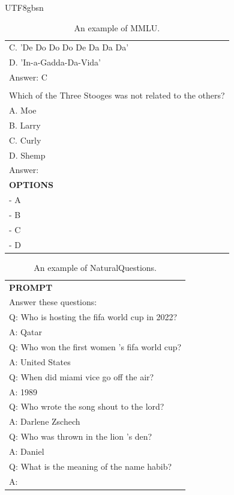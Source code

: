 \documentclass[11pt, a4paper, logo, copyright, nonumbering]{deepseek}
\begin{document}
\begin{CJK*}{UTF8}{gbsn}
\begin{table}[h]
\begin{tabular}{p{12cm}}
C. 'De Do Do Do De Da Da Da'\\
D. 'In-a-Gadda-Da-Vida'\\
Answer: C\\
\\
Which of the Three Stooges was not related to the others?\\
A. Moe\\
B. Larry\\
C. Curly\\
D. Shemp\\
Answer:\\
\midrule
\textbf{OPTIONS}\\
- A\\
- B\\
- C\\
- D\\
\bottomrule
\end{tabular}
    \caption{\centering An example of MMLU.}
    \label{tab:mmlu_eval_format_example}
\end{table}

\begin{table}[h]
    \centering \small
\begin{tabular}{p{12cm}}
\toprule
\textbf{PROMPT}\\
Answer these questions:\\
Q: Who is hosting the fifa world cup in 2022?\\
A: Qatar\\
Q: Who won the first women 's fifa world cup?\\
A: United States\\
Q: When did miami vice go off the air?\\
A: 1989\\
Q: Who wrote the song shout to the lord?\\
A: Darlene Zschech\\
Q: Who was thrown in the lion 's den?\\
A: Daniel\\
Q: What is the meaning of the name habib?\\
A:\\
\bottomrule
\end{tabular}
    \caption{\centering An example of NaturalQuestions.}
    \label{tab:naturalquestions_eval_format_example}
\end{table}


\end{CJK*}
\end{document}
